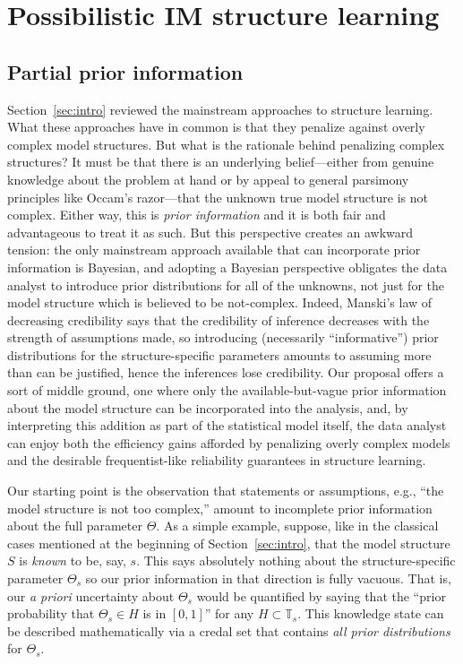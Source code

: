 \documentclass[12pt]{article}
\def\TT{\mathbb{T}}
\begin{document}
\section{Possibilistic IM structure learning} \label{sec:add_ms}

\subsection{Partial prior information}
\label{sec:ppim_constr}

Section~\ref{sec:intro} reviewed the mainstream approaches to structure learning.  What these approaches have in common is that they penalize against overly complex model structures.  But what is the rationale behind penalizing complex structures?  It must be that there is an underlying belief---either from genuine knowledge about the problem at hand or by appeal to general parsimony principles like Occam's razor---that the unknown true model structure is not complex.  Either way, this is {\em prior information} and it is both fair and advantageous to treat it as such.  But this perspective creates an awkward tension: the only mainstream approach available that can incorporate prior information is Bayesian, and adopting a Bayesian perspective obligates the data analyst to introduce prior distributions for all of the unknowns, not just for the model structure which is believed to be not-complex.  Indeed, Manski's law of decreasing credibility \citep{manski2003partial} says that the credibility of inference decreases with the strength of assumptions made, so introducing (necessarily ``informative'') prior distributions for the structure-specific parameters amounts to assuming more than can be justified, hence the inferences lose credibility.  Our proposal offers a sort of middle ground, one where only the available-but-vague prior information about the model structure can be incorporated into the analysis, and, by interpreting this addition as part of the statistical model itself, the data analyst can enjoy both the efficiency gains afforded by penalizing overly complex models and the desirable frequentist-like reliability guarantees in structure learning.  

Our starting point is the observation that statements or assumptions, e.g., ``the model structure is not too complex,'' amount to incomplete prior information about the full parameter $\Theta$.  As a simple example, suppose, like in the classical cases mentioned at the beginning of Section~\ref{sec:intro}, that the model structure $S$ is {\em known} to be, say, $s$.  This says absolutely nothing about the structure-specific parameter $\Theta_s$ so our prior information in that direction is fully vacuous.  That is, our {\em a priori} uncertainty about $\Theta_s$ would be quantified by saying that the ``prior probability that $\Theta_s \in H$ is in $[0,1]$'' for any $H \subset \TT_s$. This knowledge state can be described mathematically via a credal set that contains {\em all prior distributions} for $\Theta_s$.  
\end{document}
